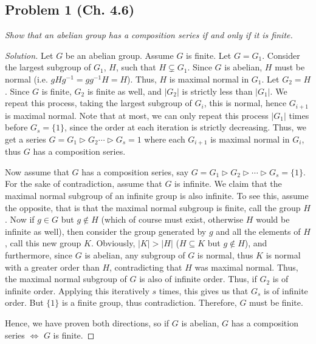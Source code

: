 \documentclass{article}
\begin{document}
\subsection*{Problem 1 (Ch. 4.6)}
{\it Show that an abelian group has a composition series if and only if it is finite.}
\begin{proof}[Solution]\let\qed\relax
	Let $G$ be an abelian group.
	Assume $G$ is finite.
	Let $G = G_1$.
	Consider the largest subgroup of $G_1$, $H$,
	such that $H \subsetneq G_1$.
	Since $G$ is abelian, $H$ must be normal
	(i.e. $gHg^{-1} = gg^{-1}H = H$).
	Thus, $H$ is maximal normal in $G_1$.
	Let $G_2 = H$.
	Since $G$ is finite, $G_2$ is finite as well,
	and $|G_2|$ is strictly less than $|G_1|$.
	We repeat this process, taking the largest subgroup of $G_i$,
	this is normal, hence $G_{i+1}$ is maximal normal.
	Note that at most, we can only repeat this process $|G_1|$
	times before $G_s = \{1\}$, since the order at each iteration
	is strictly decreasing.
	Thus, we get a series $G = G_1 \triangleright G_2 \cdots \triangleright G_s = 1$
	where each $G_{i+1}$ is maximal normal in $G_i$,
	thus $G$ has a composition series.
	
	Now assume that $G$ has a composition series, say
	$G = G_1 \triangleright G_2 \triangleright \cdots \triangleright G_s = \{1\}$.
	For the sake of contradiction, assume that $G$ is infinite.
	We claim that the maximal normal subgroup of an infinite group is also infinite.
	To see this, assume the opposite, that is that the maximal normal subgroup
	is finite, call the group $H$.
	Now if $g \in G$ but $g \not\in H$ (which of course must exist,
	otherwise $H$ would be infinite as well),
	then consider the group generated by $g$ and all the elements of $H$,
	call this new group $K$.
	Obviously, $|K| > |H|$ ($H \subseteq K$ but $g \not\in H$),
	and furthermore, since $G$ is abelian,
	any subgroup of $G$ is normal,
	thus $K$ is normal with a greater order than $H$,
	contradicting that $H$ was maximal normal.
	Thus, the maximal normal subgroup of $G$ is also of infinite order.
	Thus, if $G_2$ is of infinite order.
	Applying this iteratively $s$ times, this gives us that $G_s$
	is of infinite order.
	But $\{1\}$ is a finite group,
	thus contradiction.
	Therefore, $G$ must be finite.

	Hence, we have proven both directions, so if $G$ is abelian,
	$G$ has a composition series $\iff$ $G$ is finite.
\end{proof}
\end{document}
